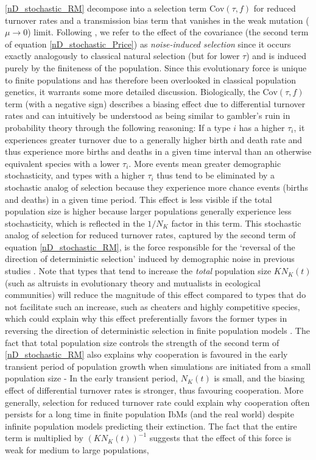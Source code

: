 \eqref{nD_stochastic_RM} decompose into a selection term $\textrm{Cov}(\tau,f)$ for reduced turnover rates and a transmission bias term that vanishes in the weak mutation ($\mu \to 0$) limit. Following \cite{week_white_2021}, we refer to the effect of the covariance (the second term of equation \eqref{nD_stochastic_Price}) as \emph{noise-induced selection} since it occurs exactly analogously to classical natural selection (but for lower $\tau$) and is induced purely by the finiteness of the population. Since this evolutionary force is unique to finite populations and has therefore been overlooked in classical population genetics, it warrants some more detailed discussion. Biologically, the $\textrm{Cov}(\tau,f)$ term (with a negative sign) describes a biasing effect due to differential turnover rates and can intuitively be understood as being similar to gambler's ruin in probability theory through the following reasoning: If a type $i$ has a higher $\tau_i$, it experiences greater turnover due to a generally higher birth and death rate and thus experience more births and deaths in a given time interval than an otherwise equivalent species with a lower $\tau_i$. More events mean greater demographic stochasticity, and types with a higher $\tau_i$ thus tend to be eliminated by a stochastic analog of selection because they experience more chance events (births and deaths) in a given time period. This effect is less visible if the total population size is higher because larger populations generally experience less stochasticity, which is reflected in the $1/N_K$ factor in this term. This stochastic analog of selection for reduced turnover rates, captured by the second term of equation \eqref{nD_stochastic_RM}, is the force responsible for the `reversal of the direction of deterministic selection' induced by demographic noise in previous studies \citep{houchmandzadeh_selection_2012, houchmandzadeh_fluctuation_2015, constable_demographic_2016, mcleod_social_2019}. Note that types that tend to increase the \emph{total} population size $KN_K(t)$ (such as altruists in evolutionary theory and mutualists in ecological communities) will reduce the magnitude of this effect compared to types that do not facilitate such an increase, such as cheaters and highly competitive species, which could explain why this effect preferentially favors the former types in reversing the direction of deterministic selection in finite population models \citep{houchmandzadeh_fluctuation_2015, mcleod_social_2019}. The fact that total population size controls the strength of the second term of \eqref{nD_stochastic_RM} also explains why cooperation is favoured in the early transient period of population growth \citep{melbinger_evolutionary_2010} when simulations are initiated from a small population size - In the early transient period, $N_K(t)$ is small, and the biasing effect of differential turnover rates is stronger, thus favouring cooperation. More generally, selection for reduced turnover rate could explain why cooperation often persists for a long time in finite population IbMs (and the real world) despite infinite population models predicting their extinction. The fact that the entire term is multiplied by $(KN_K(t))^{-1}$ suggests that the effect of this force is weak for medium to large populations, 